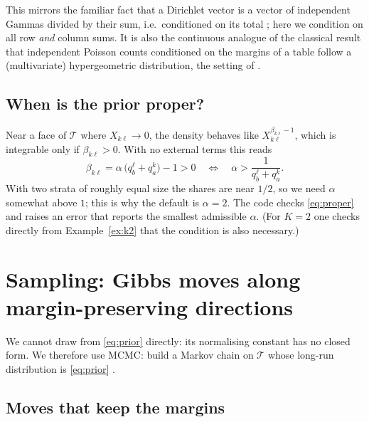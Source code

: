 \documentclass[11pt,a4paper]{article}
\theoremstyle{definition}
\theoremstyle{remark}
\newcommand{\T}{\mathcal{T}}
\begin{document}
This mirrors the familiar fact that a Dirichlet vector is a vector of
independent Gammas divided by their sum, i.e.\ conditioned on its total
\citep{ng2011dirichlet}; here we condition on all row \emph{and} column sums.
It is also the continuous analogue of the classical result that independent
Poisson counts conditioned on the margins of a table follow a (multivariate)
hypergeometric distribution, the setting of \citet{diaconis1998algebraic}.

\subsection{When is the prior proper?}

Near a face of $\T$ where $X_{k\ell} \to 0$, the density behaves like
$X_{k\ell}^{\beta_{k\ell}-1}$, which is integrable only if
$\beta_{k\ell} > 0$. With no external terms this reads
\begin{equation}
  \label{eq:proper}
  \beta_{k\ell} = \alpha\,\bigl(q^{\ell}_{b} + q^{k}_{a}\bigr) - 1 > 0
  \quad\Longleftrightarrow\quad
  \alpha > \frac{1}{q^{\ell}_{b} + q^{k}_{a}} .
\end{equation}
With two strata of roughly equal size the shares are near $1/2$, so we need
$\alpha$ somewhat above $1$; this is why the default is $\alpha = 2$.
The code checks \eqref{eq:proper} and raises an error that reports the
smallest admissible $\alpha$. (For $K=2$ one checks directly from
Example~\ref{ex:k2} that the condition is also necessary.)

\section{Sampling: Gibbs moves along margin-preserving directions}
\label{sec:gibbs}

We cannot draw from \eqref{eq:prior} directly: its normalising constant has
no closed form. We therefore use MCMC: build a Markov chain on $\T$ whose
long-run distribution is \eqref{eq:prior} \citep{robert2004monte}.

\subsection{Moves that keep the margins}
\end{document}
